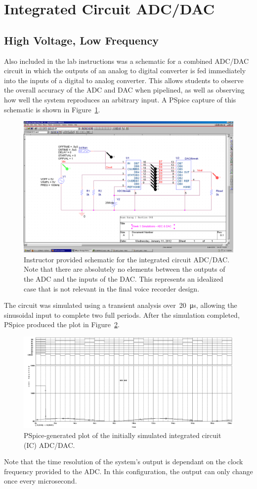 \section{Integrated Circuit ADC/DAC}
\subsection{High Voltage, Low Frequency}
Also included in the lab instructions was a schematic for a combined ADC/DAC
circuit in which the outputs of an analog to digital converter is fed
immediately into the inputs of a digital to analog converter.  This allows
students to observe the overall accuracy of the ADC and DAC when pipelined, as
well as observing how well the system reproduces an arbitrary input.  A PSpice
capture of this schematic is shown in Figure~\ref{f:combined_schem}.
%
\begin{figure}[H]
\centering
	\includegraphics[width=.8\textwidth]{img/shot/part3_schem.PNG}
	\parbox{.8\textwidth}{
	\caption[Integrated Circuit --- Schematic]{Instructor provided schematic
	for the integrated circuit ADC/DAC.  Note that there are absolutely no
	elements between the outputs of the ADC and the inputs of the DAC.  This
	represents an idealized case that is not relevant in the final voice
	recorder design.}
	\label{f:combined_schem}}
\end{figure}
%
The circuit was simulated using a transient analysis
over~\SI{20}{\micro\second}, allowing the sinusoidal input to complete two full
periods.  After the simulation completed, PSpice produced the plot in
Figure~\ref{f:combined_plot1}.
%
\begin{figure}[H]
\centering
	\includegraphics[width=.8\textwidth]{img/plot/part3_plot1.PNG}
	\parbox{.8\textwidth}{
	\caption[Integrated Circuit --- Initial Results]{PSpice-generated plot of
	the initially simulated integrated circuit (IC) ADC/DAC.}
	\label{f:combined_plot1}}
\end{figure}
%
Note that the time resolution of the system's output is dependant on the clock
frequency provided to the ADC.  In this configuration, the output can only
change once every microsecond.


